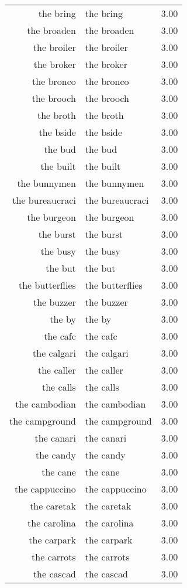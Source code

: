 \begin{table}[ht]
\begin{tabular}{rlr}
  the bring & the bring & 3.00 \\ 
  the broaden & the broaden & 3.00 \\ 
  the broiler & the broiler & 3.00 \\ 
  the broker & the broker & 3.00 \\ 
  the bronco & the bronco & 3.00 \\ 
  the brooch & the brooch & 3.00 \\ 
  the broth & the broth & 3.00 \\ 
  the bside & the bside & 3.00 \\ 
  the bud & the bud & 3.00 \\ 
  the built & the built & 3.00 \\ 
  the bunnymen & the bunnymen & 3.00 \\ 
  the bureaucraci & the bureaucraci & 3.00 \\ 
  the burgeon & the burgeon & 3.00 \\ 
  the burst & the burst & 3.00 \\ 
  the busy & the busy & 3.00 \\ 
  the but & the but & 3.00 \\ 
  the butterflies & the butterflies & 3.00 \\ 
  the buzzer & the buzzer & 3.00 \\ 
  the by & the by & 3.00 \\ 
  the cafc & the cafc & 3.00 \\ 
  the calgari & the calgari & 3.00 \\ 
  the caller & the caller & 3.00 \\ 
  the calls & the calls & 3.00 \\ 
  the cambodian & the cambodian & 3.00 \\ 
  the campground & the campground & 3.00 \\ 
  the canari & the canari & 3.00 \\ 
  the candy & the candy & 3.00 \\ 
  the cane & the cane & 3.00 \\ 
  the cappuccino & the cappuccino & 3.00 \\ 
  the caretak & the caretak & 3.00 \\ 
  the carolina & the carolina & 3.00 \\ 
  the carpark & the carpark & 3.00 \\ 
  the carrots & the carrots & 3.00 \\ 
  the cascad & the cascad & 3.00 \\ 

\end{tabular}
\end{table}
